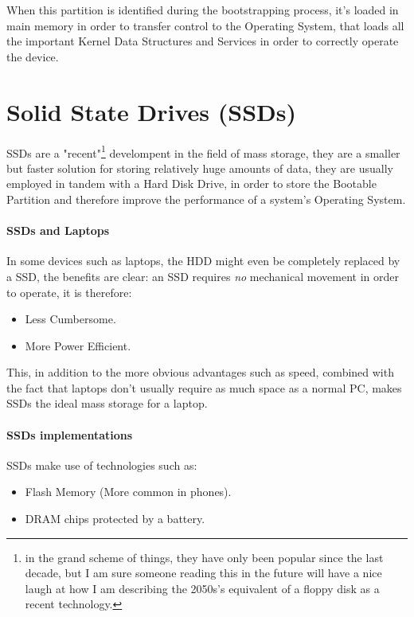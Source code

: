 \documentclass[openright, twoside]{report}
\theoremstyle{definition}
\theoremstyle{example}
\begin{document}
When this partition is identified during the bootstrapping process, it's 
loaded in main memory in order to transfer control to the Operating System, that 
loads all the important Kernel Data Structures and Services in order to correctly 
operate the device.

\section{Solid State Drives (SSDs)}
SSDs are a "recent"\footnote{in the grand scheme of things, they have only been popular 
since the last decade, but I am sure someone reading this in the future will have a nice laugh 
at how I am describing the 2050s's equivalent of a floppy disk as a recent technology.}
develompent in the field of mass storage, they are a smaller but faster solution for 
storing relatively huge amounts of data, they are usually employed in tandem with a Hard 
Disk Drive, in order to store the Bootable Partition and therefore improve the performance 
of a system's Operating System.

\paragraph{SSDs and Laptops}
In some devices such as laptops, the HDD might even be completely replaced by a SSD, 
the benefits are clear: an SSD requires \emph{no} mechanical movement in order to operate, 
it is therefore:

\begin{itemize}
	\item Less Cumbersome.
	\item More Power Efficient.
\end{itemize}

This, in addition to the more obvious advantages such as speed, combined with the fact that 
laptops don't usually require as much space as a normal PC, makes SSDs the ideal mass storage 
for a laptop.

\paragraph{SSDs implementations}
SSDs make use of technologies such as:

\begin{itemize}
	\item Flash Memory (More common in phones).
	\item DRAM chips protected by a battery.
\end{itemize}
\end{document}
